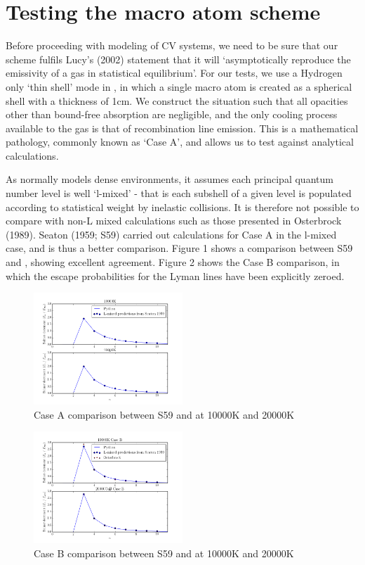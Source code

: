 \documentclass[usenatbib, a4paper]{mn2e}
\begin{document}
%
%

\section{Testing the macro atom scheme}

Before proceeding with modeling of CV systems, we need to be sure that our scheme fulfils Lucy's (2002) 
statement that it will `asymptotically reproduce the emissivity of a gas in statistical equilibrium'.
For our tests, we use a Hydrogen only `thin shell' mode in \py, in which a single macro atom is created as a spherical 
shell with a thickness of 1cm. We construct the situation such that all opacities other than 
bound-free absorption are negligible, and the only cooling process available to the gas is that of
recombination line emission. This is a mathematical pathology, commonly known as `Case A', and allows
us to test against analytical calculations.

As \py normally models dense environments, it assumes each principal quantum number level is
well `l-mixed' - that is each subshell of a given level is populated according to statistical weight by
inelastic collisions. It is therefore not possible to compare with non-L mixed calculations such as 
those presented in Osterbrock (1989\nocite{oster}). Seaton (1959; S59\nocite{seaton}) carried out calculations
for Case A in the l-mixed case, and is thus a better comparison. Figure 1 shows a comparison between S59
and \py, showing excellent agreement. Figure 2 shows the Case B comparison, in which the escape probabilities
for the Lyman lines have been explicitly zeroed.

\begin{figure}
\includegraphics[width=0.5\textwidth]{caseA.png}
\caption{Case A comparison between S59 and \py at 10000K and 20000K}
\end{figure}

\begin{figure}
\includegraphics[width=0.5\textwidth]{caseB.png}
\caption{Case B comparison between S59 and \py at 10000K and 20000K}
\end{figure}
\end{document}
